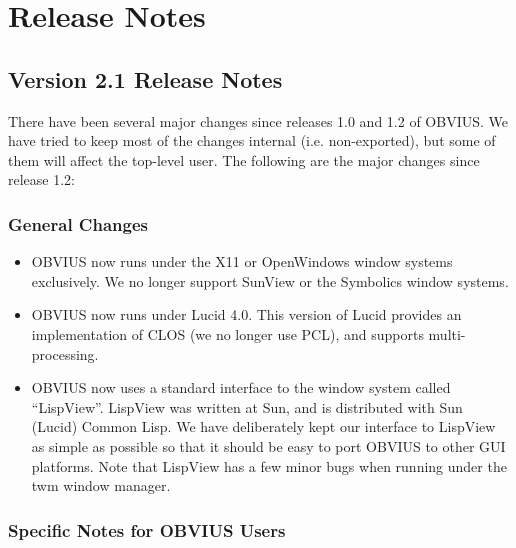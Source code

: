 \section{Release Notes}
\label{sec:release-notes}

\subsection{Version 2.1 Release Notes}

There have been several major changes since releases 1.0 and 1.2 of
OBVIUS.  We have tried to keep most of the changes internal (i.e.
non-exported), but some of them will affect the top-level user.  The
following are the major changes since release 1.2:

\subsubsection{General Changes}

\begin{itemize}

\item OBVIUS now runs under the X11 or OpenWindows window systems  exclusively.
We no longer support SunView or the Symbolics window systems.

\item OBVIUS now runs under Lucid 4.0.  This version of Lucid provides
an implementation of CLOS (we no longer use PCL), and supports
multi-processing.

\item OBVIUS now uses a standard interface to the window system called
``LispView''.  LispView was written at Sun, and is distributed with
Sun (Lucid) Common Lisp.  We have deliberately kept our interface to
LispView as simple as possible so that it should be easy to port
OBVIUS to other GUI platforms.  Note that LispView has a few minor
bugs when running under the twm window manager.

\end{itemize}

\subsubsection{Specific Notes for OBVIUS Users}

